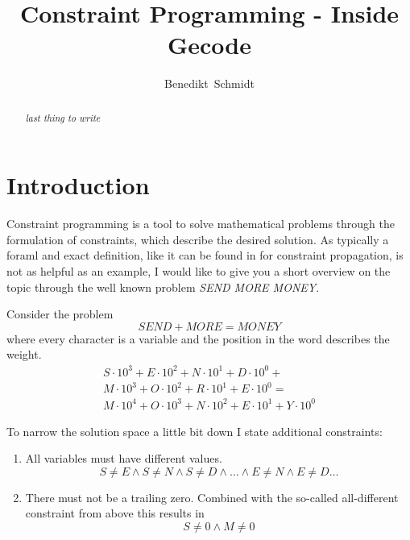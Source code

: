 \documentclass[10pt,
               a4paper,
               journal,
               ]{IEEEtran}
\makeatletter
\def\markboth#1#2{\def\leftmark{\@IEEEcompsoconly{\sffamily}\MakeUppercase{\protect#1}}%
\def\rightmark{\@IEEEcompsoconly{\sffamily}\MakeUppercase{\protect#2}}}
\makeatother
\begin{document}
	\title{Constraint Programming - Inside Gecode}
	\author{Benedikt~Schmidt}
	\markboth{Advanced Seminar for Security in Information Technology, Summer Term 2014}%
	{Benedikt Schmidt: Constraint Programming - Inside Gecode}	
	\maketitle	
	
	\begin{abstract}	
		\textit{last thing to write}	
	\end{abstract}
	
	\section{Introduction}
	Constraint programming is a tool to solve mathematical problems through the formulation of constraints, which describe the desired solution. As typically a foraml and exact definition, like it can be found in \cite[p. 16]{handbookCP} for constraint propagation, is not as helpful as an example, I would like to give you a short overview on the topic through the well known problem \emph{SEND MORE MONEY}.
	
	Consider the problem
	\[SEND + MORE = MONEY\]
	where every character is a variable and the position in the word describes the weight.
	\begin{equation}
	\begin{split}
		S \cdot 10^3 + E \cdot 10^2 + N \cdot 10^1 + D \cdot 10^0 + \\ 
		M \cdot 10^3 + O \cdot 10^2 + R \cdot 10^1 + E \cdot 10^0 = \\ 
		M \cdot 10^4 + O \cdot 10^3 + N \cdot 10^2 + E \cdot 10^1 + Y \cdot 10^0
	\end{split}
	\end{equation}		
	
	To narrow the solution space a little bit down I state additional constraints:
	\begin{enumerate}
	\item All variables must have different values.
		\begin{equation}
			S \ne E \land S \ne N \land S \ne D \land \dots \land E \ne N \land E \ne D \dots
		\end{equation}	
	\item There must not be a trailing zero. Combined with the so-called all-different constraint \cite{allDifferent} from above this results in
		\begin{equation}
			S \ne 0 \land M \ne 0
		\end{equation}
	\end{enumerate}
	
\end{document}
